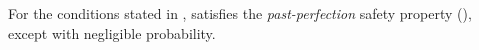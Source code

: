 \begin{lemma}\label{lem:pod-pp-safety}
	For the conditions stated in ,  satisfies the \emph{past-perfection} safety property (), except with negligible probability.
\end{lemma}
